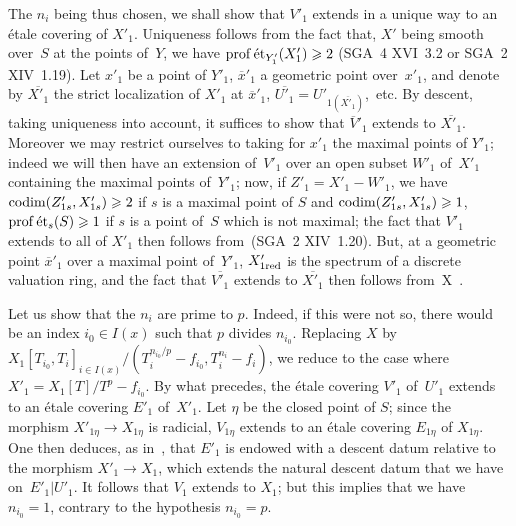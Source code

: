 The $n_{i}$ being thus chosen, we shall show that $V'_{1}$
extends in a unique way to an \'etale covering of
$X'_{1}$. Uniqueness follows from the fact that, $X'$ being smooth
over~$S$ at the points of~$Y$, we have $\operatorname{prof}\mathrm{\acute{e}t}_{Y'_{1}}(X'_{1})\geqslant 2$
(SGA~4 XVI~3.2 or SGA~2 XIV~1.19). Let $x'_{1}$ be a point of
$Y'_{1}$, $\overline{x}'_{1}$ a geometric point over~$x'_{1}$,
and denote by $\overline{X'_{1}}$ the strict localization of
$X'_{1}$ at $\overline{x}'_{1}$,
$\overline{U'_{1}}=U'_{1(\overline{X'_{1}})}$,~etc. By descent,
taking uniqueness into account, it suffices to show that
$\overline{V}'_{1}$ extends to $\overline{X'_{1}}$. Moreover we
may restrict ourselves to taking for $x'_{1}$ the maximal points of
$Y'_{1}$; indeed we will then have an extension of~$V'_{1}$ over an
open subset $W'_{1}$ of~$X'_{1}$ containing the maximal points of~$Y'_{1}$;
now, if $Z'_{1}=X'_{1}- W'_{1}$, we have
$\operatorname{codim}(Z'_{1s},X'_{1s})\geqslant 2$ if $s$ is a maximal point of
$S$ and $\operatorname{codim}(Z'_{1s},X'_{1s})\geqslant 1$, $\operatorname{prof}\mathrm{\acute{e}t}_{s}(S)\geqslant
1$ if $s$ is a point of~$S$ which is not maximal; the fact that
$V'_{1}$ extends to all of $X'_{1}$ then follows
from~(SGA~2 XIV~1.20). But, at a geometric point
$\overline{x}'_{1}$ over a maximal point of~$Y'_{1}$,
$X'_{1\mathrm{red}}$ is the spectrum of a discrete valuation ring, and
the fact that $\overline{V'_{1}}$ extends to $\overline{X'_{1}}$
then follows from~X~.

Let us show that the $n_{i}$ are prime to $p$. Indeed, if this
were not so, there would be an index $i_{0}\in I(x)$ such that $p$
divides $n_{i_{0}}$. Replacing $X$ by
$X_{1}[T_{i_{0}},T_{i}]_{i\in I(x)}\big/
(T_{i}^{n_{i_{0}}/p}-f_{i_{0}},T_{i}^{n_{i}}-f_{i})$, we reduce
to the case where $X'_{1}=X_{1}[T]/T^{p}-f_{i_{0}}$. By what
precedes, the \'etale
covering $V'_{1}$ of~$U'_{1}$ extends to an \'etale
covering $E'_{1}$ of~$X'_{1}$. Let $\eta$ be the closed point of
$S$; since the morphism $X'_{1\eta}\to X_{1\eta}$ is radicial,
$V_{1\eta}$ extends to an \'etale covering $E_{1\eta}$ of
$X_{1\eta}$. One then deduces, as in~, that
$E'_{1}$ is endowed with a descent datum relative to the
morphism $X'_{1}\to X_{1}$, which extends the natural descent
datum that we have on~$E'_{1}|U'_{1}$. It follows that
$V_{1}$ extends to $X_{1}$; but this implies that we have
$n_{i_{0}}=1$, contrary to the hypothesis $n_{i_{0}}=p$.

